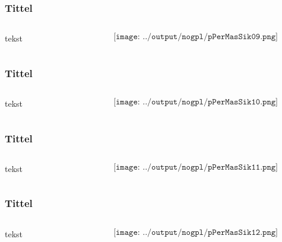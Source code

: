 \documentclass[aspectratio=169,xcolor=dvipsnames]{beamer}
\begin{document}
\begin{frame}
	\frametitle{Tittel}
	\begin{columns}
		\begin{column}{0.5\textwidth}
tekst
			
		\end{column}

		\begin{column}{0.5\textwidth}
	$$\texttt{[image: ../output/nogpl/pPerMasSik09.png]}$$
		\end{column}
	\end{columns}
\end{frame}

\begin{frame}
	\frametitle{Tittel}
	\begin{columns}
		\begin{column}{0.5\textwidth}
tekst
			
		\end{column}

		\begin{column}{0.5\textwidth}
	$$\texttt{[image: ../output/nogpl/pPerMasSik10.png]}$$
		\end{column}
	\end{columns}
\end{frame}

\begin{frame}
	\frametitle{Tittel}
	\begin{columns}
		\begin{column}{0.5\textwidth}
tekst
			
		\end{column}

		\begin{column}{0.5\textwidth}
	$$\texttt{[image: ../output/nogpl/pPerMasSik11.png]}$$
		\end{column}
	\end{columns}
\end{frame}

\begin{frame}
	\frametitle{Tittel}
	\begin{columns}
		\begin{column}{0.5\textwidth}
tekst
			
		\end{column}

		\begin{column}{0.5\textwidth}
	$$\texttt{[image: ../output/nogpl/pPerMasSik12.png]}$$
		\end{column}
	\end{columns}
\end{frame}
\end{document}
